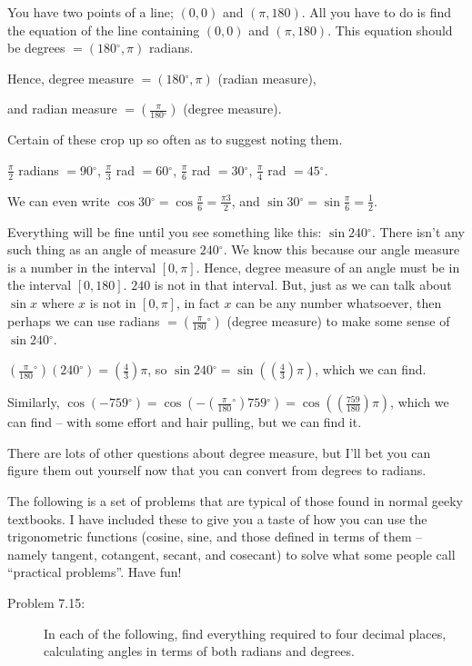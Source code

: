 \documentclass[english]{book}
\newcommand{\degrees}{\ensuremath{^{\circ}}}
\begin{document}
You have two points of a line; $(0,0)$ and $(\pi,180)$. All you have to do is find the equation of the line containing $(0,0)$ and $(\pi,180)$. This equation should be degrees $= (180 \degrees,\pi)$ radians. 

Hence, degree measure $= (180 \degrees,\pi)$ (radian measure),

and radian measure $= (\frac{\pi}{180 \degrees})$ (degree measure).

Certain of these crop up so often as to suggest noting them.

$\frac{\pi}{2}$ radians $= 90 \degrees$, $\frac{\pi}{3}$ rad $= 60 \degrees$, $\frac{\pi}{6}$ rad $= 30 \degrees$, $\frac{\pi}{4}$ rad $= 45 \degrees$. 

We can even write $\cos 30 \degrees = \cos \frac{\pi}{6} = \frac{\pi 3}{2}$, and $\sin 30 \degrees = \sin \frac{\pi}{6} = \frac{1}{2}$.

Everything will be fine until you see something like this: $\sin 240 \degrees$. There isn't any such thing as an angle of measure $240 \degrees$. We know this because our angle measure is a number in the interval $[0,\pi]$. Hence, degree measure of an angle must be in the interval $[0,180]$. $240$ is not in that interval. But, just as we can talk about $\sin x$ where $x$ is not in $[0,\pi]$, in fact $x$ can be any number whatsoever, then perhaps we can use radians $= (\frac{\pi}{180} \degrees)$ (degree measure) to make some sense of $\sin 240 \degrees$.

$(\frac{\pi}{180} \degrees) (240 \degrees) = (\frac{4}{3}) \pi$, so $\sin 240 \degrees = \sin ((\frac{4}{3}) \pi)$, which we can find. 

Similarly, $\cos (-759 \degrees) = \cos (-(\frac{\pi}{180} \degrees) 759 \degrees) = \cos ((\frac{759}{180})\pi)$, which we can find -- with some effort and hair pulling, but we can find it.

There are lots of other questions about degree measure, but I'll bet you can figure them out yourself now that you can convert from degrees to radians.

The following is a set of problems that are typical of those found in normal geeky textbooks. I have included these to give you a taste of how you can use the trigonometric functions (cosine, sine, and those defined in terms of them -- namely tangent, cotangent, secant, and cosecant) to solve what some people call ``practical problems''. Have fun!

\begin{description}

\item[Problem 7.15:] In each of the following, find everything required to four decimal places, calculating angles in terms of both radians and degrees.

\end{description}
\end{document}
